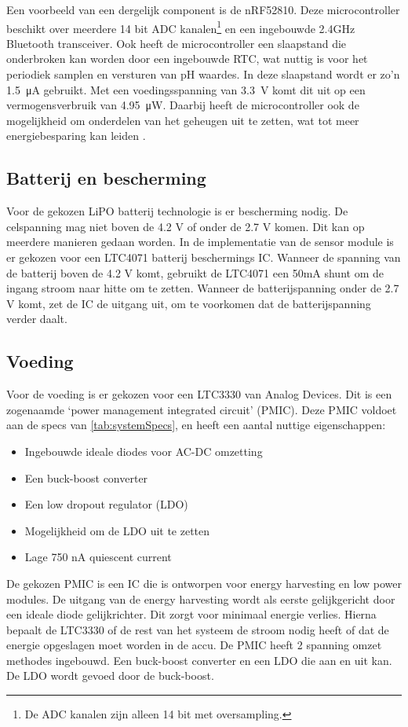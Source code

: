 Een voorbeeld van een dergelijk component is de nRF52810. Deze microcontroller beschikt over meerdere 14 bit ADC kanalen\footnote{De ADC kanalen zijn alleen 14 bit met oversampling.} en een ingebouwde 2.4GHz Bluetooth transceiver.
Ook heeft de microcontroller een slaapstand die onderbroken kan worden door een ingebouwde RTC, wat nuttig is voor het periodiek samplen en versturen van pH waardes. In deze slaapstand wordt er zo'n \qty{1.5}{\micro\ampere} gebruikt. Met een voedingsspanning van \qty{3.3}{\volt} komt dit uit op een vermogensverbruik van \qty{4.95}{\micro\watt}. Daarbij heeft de microcontroller ook de mogelijkheid om onderdelen van het geheugen uit te zetten, wat tot meer energiebesparing kan leiden \cite{nrf52810}.


\subsection{Batterij en bescherming}

Voor de gekozen LiPO batterij technologie is er bescherming nodig. De celspanning mag niet boven de 4.2 V of onder de 2.7 V komen. Dit kan op meerdere manieren gedaan worden. In de implementatie van de sensor module is er gekozen voor een LTC4071 batterij beschermings IC. Wanneer de spanning van de batterij boven de 4.2 V komt, gebruikt de LTC4071 een 50mA shunt om de ingang stroom naar hitte om te zetten. Wanneer de batterijspanning onder de 2.7 V komt, zet de IC de uitgang uit, om te voorkomen dat de batterijspanning verder daalt.

\subsection{Voeding}
Voor de voeding is er gekozen voor een LTC3330 van Analog Devices. Dit is een zogenaamde `power management integrated circuit' (PMIC). Deze PMIC voldoet aan de specs van \cref{tab:systemSpecs}, en heeft een aantal nuttige eigenschappen:
\begin{itemize}
    \item Ingebouwde ideale diodes voor AC-DC omzetting
    \item Een buck-boost converter
    \item Een low dropout regulator (LDO)
    \item Mogelijkheid om de LDO uit te zetten
    \item Lage 750 nA quiescent current
\end{itemize}

De gekozen PMIC is een IC die is ontworpen voor energy harvesting en low power modules. De uitgang van de energy harvesting wordt als eerste gelijkgericht door een ideale diode gelijkrichter. Dit zorgt voor minimaal energie verlies. Hierna bepaalt de LTC3330 of de rest van het systeem de stroom nodig heeft of dat de energie opgeslagen moet worden in de accu. De PMIC heeft 2 spanning omzet methodes ingebouwd. Een buck-boost converter en een LDO die aan en uit kan. De LDO wordt gevoed door de buck-boost.


